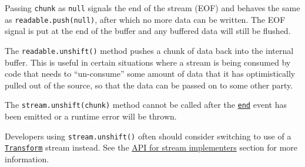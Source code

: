 Passing \texttt{chunk} as \texttt{null} signals the end of the stream
(EOF) and behaves the same as \texttt{readable.push(null)}, after which
no more data can be written. The EOF signal is put at the end of the
buffer and any buffered data will still be flushed.

The \texttt{readable.unshift()} method pushes a chunk of data back into
the internal buffer. This is useful in certain situations where a stream
is being consumed by code that needs to ``un-consume'' some amount of
data that it has optimistically pulled out of the source, so that the
data can be passed on to some other party.

The \texttt{stream.unshift(chunk)} method cannot be called after the
\hyperref[event-end]{\texttt{\textquotesingle{}end\textquotesingle{}}}
event has been emitted or a runtime error will be thrown.

Developers using \texttt{stream.unshift()} often should consider
switching to use of a
\hyperref[class-streamtransform]{\texttt{Transform}} stream instead. See
the \hyperref[api-for-stream-implementers]{API for stream implementers}
section for more information.

